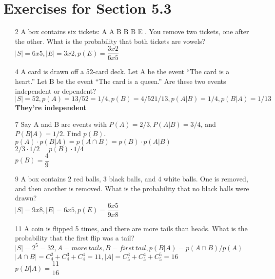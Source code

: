 \documentclass[12pt]{article}
\begin{document}
\section*{Exercises for Section 5.3}
\begin{enumerate}
    \item [2] A box contains six tickets: A A B B B E . You remove two tickets, one after the other. What is the probability that both tickets are vowels?\\
	$|S| = 6x5, |E| = 3x2, p(E) = \dfrac{3x2}{6x5}$
    \item [4] A card is drawn off a 52-card deck. Let A be the event “The card is a heart.” Let B be the event “The card is a queen.” Are these two events independent or dependent?\\
	$|S| = 52, p(A) = 13/52 = 1/4, p(B) = 4/52 1/13, p(A|B) = 1/4, p(B|A) = 1/13$\\
	\textbf{They're independent}
    \item [7] Say A and B are events with $P(A) = 2/3, P(A|B) = 3/4$, and $P(B|A) = 1/2$. Find $p(B)$.\\
	$p(A)\cdot p(B|A) = p(A\cap B) = p(B) \cdot p(A|B)$\\
	$2/3 \cdot 1/2 = p(B) \cdot 1/4$\\
	$p(B) = \dfrac{4}{9}$
    \item [9] A box contains 2 red balls, 3 black balls, and 4 white balls. One is removed, and then another is removed. What is the probability that no black balls were drawn?\\
	$|S| = 9x8, |E| = 6x5, p(E) = \dfrac{6x5}{9x8}$
    \item [11] A coin is flipped 5 times, and there are more tails than heads. What is the probability that the first flip was a tail?\\
	$|S| = 2^5 = 32, A = more\ tails, B = first\ tail, p(B|A) = p(A\cap B)/p(A)$\\
	$|A \cap B| = C_4^2 + C_4^3 + C_4^4 = 11, |A| = C_5^3 + C_5^4 + C_5^5 = 16$\\
	$p(B|A) = \dfrac{11}{16}$
\end{enumerate}
\end{document}
